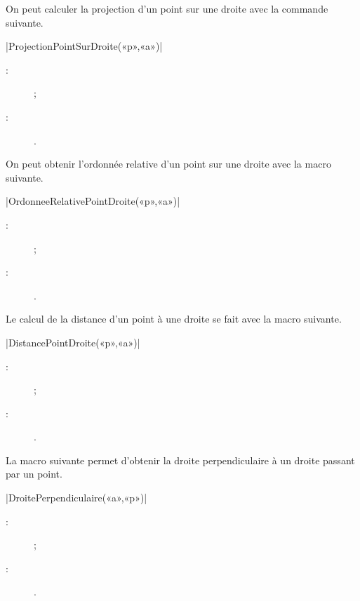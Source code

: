 \documentclass[a4paper,french]{article}
\begin{document}
On peut calculer la projection d'un point sur une droite avec la commande
suivante.

\begin{colourband}
\macro|ProjectionPointSurDroite(«p»,«a»)|
\begin{description}
  \item[:]  ;
  \item[:]  .
\end{description}
\end{colourband}

On peut obtenir l'ordonnée relative d'un point sur une droite avec la macro
suivante.
\begin{colourband}
\macro|OrdonneeRelativePointDroite(«p»,«a»)|
\begin{description}
  \item[:]  ;
  \item[:]  .
\end{description}
\end{colourband}

Le calcul de la distance d'un point à une droite se fait avec la macro suivante.
\begin{colourband}
\macro|DistancePointDroite(«p»,«a»)|
\begin{description}
  \item[:]  ;
  \item[:]  .
\end{description}
\end{colourband}

La macro suivante permet d'obtenir la droite perpendiculaire à un droite passant
par un point.
\begin{colourband}
\macro|DroitePerpendiculaire(«a»,«p»)|
\begin{description}
  \item[:]   ;
  \item[:] .
\end{description}
\end{colourband}
\end{document}
